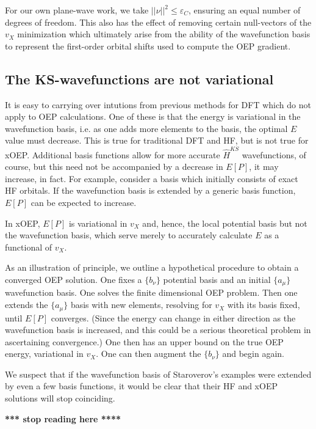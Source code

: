 \documentclass{article}
\newcommand{\norm}[1]{\left|\left|{#1}\right|\right|}
\begin{document}
For our own plane-wave work, we take $\norm{\nu}^2 \le \varepsilon_C$,
ensuring an equal number of degrees of freedom.  This also has the
effect of removing certain null-vectors of the $v_X$ minimization which
ultimately arise from the ability of the wavefunction basis to represent
the first-order orbital shifts used to compute the OEP gradient.

\subsection{The KS-wavefunctions are not variational}

It is easy to carrying over intutions from previous methods for DFT
which do not apply to OEP calculations.  One of these is that the
energy is variational in the wavefunction basis, i.e. as one adds more
elements to the basis, the optimal $E$ value must decrease.  This is
true for traditional DFT and HF, but is not true for xOEP.  Additional basis
functions allow for more accurate $\hat{H}^{KS}$ wavefunctions, of
course, but this need not be accompanied by a decrease in $E[P]$, it
may increase, in fact.  For example, consider a basis which initially
consists of exact HF orbitals.  If the wavefunction basis is extended
by a generic basis function, $E[P]$ can be expected to increase.

In xOEP, $E[P]$ is variational in $v_X$ and, hence, the local potential
basis but not the wavefunction basis, which serve merely to accurately
calculate $E$ as a functional of $v_X$.

As an illustration of principle, we outline a hypothetical procedure
to obtain a converged OEP solution.  One fixes a $\{b_\nu\}$ potential
basis and an initial $\{a_\mu\}$ wavefunction basis.  One solves the
finite dimensional OEP problem.  Then one extends the $\{a_\mu\}$
basis with new elements, resolving for $v_X$ with its basis fixed,
until $E[P]$ converges.  (Since the energy can change in either direction
as the wavefunction basis is increased, and this could be a serious
theoretical problem in ascertaining convergence.)  One then has an
upper bound on the true OEP energy, variational in $v_X$.  One can
then augment the $\{b_\nu\}$ and begin again.

We suspect that if the wavefunction basis of Staroverov's examples
were extended by even a few basis functions, it would be clear that
their HF and xOEP solutions will stop coinciding.


{\bf **** stop reading here ****}
\end{document}
